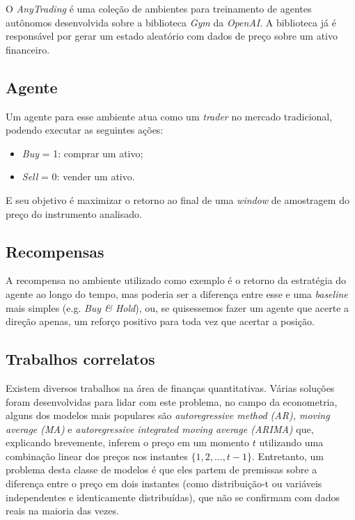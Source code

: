 \documentclass[12pt]{article}
\begin{document}
O \textit{AnyTrading} é uma coleção de ambientes para treinamento de agentes autônomos desenvolvida sobre a biblioteca \textit{Gym}\cite{gym} da \textit{OpenAI}. A biblioteca já é responsável por gerar um estado aleatório com dados de preço sobre um ativo financeiro.

\subsection{Agente}

Um agente para esse ambiente atua como um \textit{trader} no mercado tradicional, podendo executar as seguintes ações:

\begin{itemize}
    \item \textit{Buy} = 1: comprar um ativo;
    \item \textit{Sell} = 0: vender um ativo.
\end{itemize}

E seu objetivo é maximizar o retorno ao final de uma \textit{window} de amostragem do preço do instrumento analisado.

\subsection{Recompensas}

A recompensa no ambiente utilizado como exemplo é o retorno da estratégia do agente ao longo do tempo, mas poderia ser a diferença entre esse e uma \textit{baseline} mais simples (e.g. \textit{Buy & Hold}), ou, se quisessemos fazer um agente que acerte a direção apenas, um reforço positivo para toda vez que acertar a posição.

\subsection{Trabalhos correlatos}

Existem diversos trabalhos na área de finanças quantitativas. Várias soluções foram desenvolvidas para lidar com este problema, no campo da econometria, alguns dos modelos mais populares são \textit{autoregressive method (AR), moving average (MA)} e \textit{autoregressive integrated moving average (ARIMA)}\cite{hamilton, wooldridge2009introductory} que, explicando brevemente, inferem o preço em um momento $t$ utilizando uma combinação linear dos preços nos instantes $\{1,2,...,t-1\}$. Entretanto, um problema desta classe de modelos é que eles partem de premissas sobre a diferença entre o preço em dois instantes (como distribuição-t ou variáveis independentes e identicamente distribuídas), que não se confirmam com dados reais na maioria das vezes.\par
\end{document}
